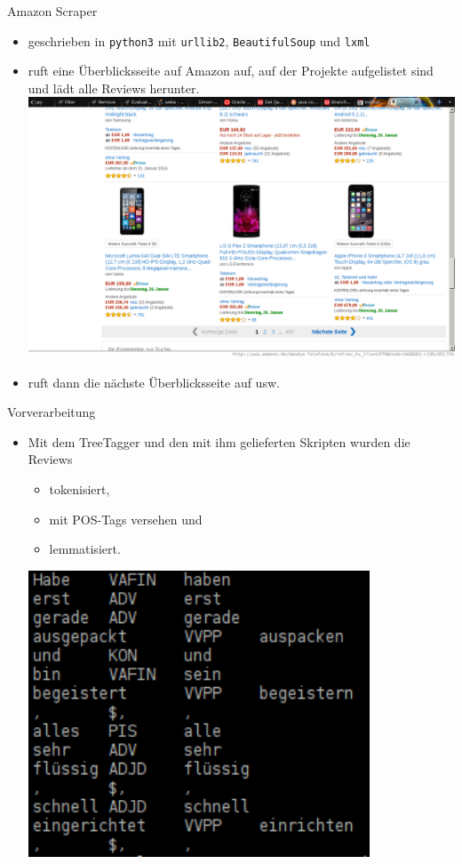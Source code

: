 \documentclass[note=hide]{beamer} %
\newcommand{\pymodule}[1]{\texttt{#1}}
\newcommand{\proglang}[1]{\texttt{#1}}
\begin{document}
\begin{frame}{Amazon Scraper}
	\begin{itemize}
		\item geschrieben in \proglang{python3} mit \pymodule{urllib2}, \pymodule{BeautifulSoup} und \pymodule{lxml}
		\item ruft eine Überblicksseite auf Amazon auf, auf der Projekte aufgelistet sind und lädt alle Reviews herunter.\\[0.3cm]
			\includegraphics[height=0.6\textheight]{amazon_overview_smartphones.png}
		\item ruft dann die nächste Überblicksseite auf usw.
	\end{itemize}
\end{frame}

\begin{frame}{Vorverarbeitung}
	\begin{itemize}
		\item Mit dem TreeTagger und den mit ihm gelieferten Skripten wurden die Reviews
			\begin{itemize}
				\item tokenisiert,
				\item mit POS-Tags versehen und
				\item lemmatisiert. \\[0.3cm]
			\end{itemize}
			\includegraphics[width=0.8\textwidth]{content_tagged_example_black.png}
	\end{itemize}
\end{frame}
\end{document}
